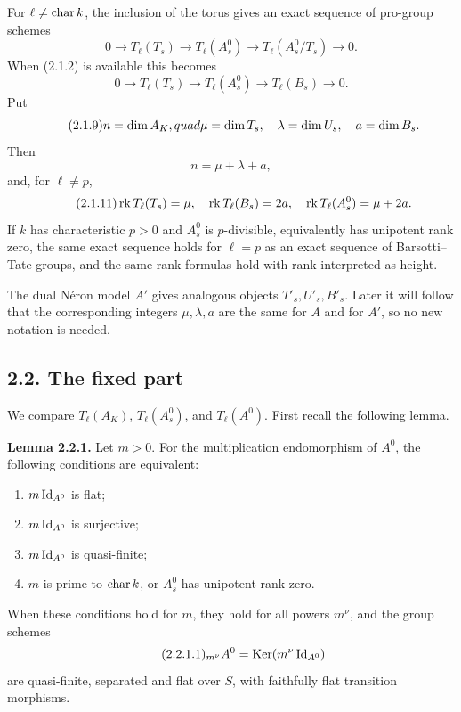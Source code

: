 \documentclass[11pt]{article}
\providecommand{\Ker}{\operatorname{Ker}}
\begin{document}
For \(\ell\ne\operatorname{char} k\), the inclusion of the torus gives an exact sequence of pro-group schemes
\begin{equation}\tag{2.1.6}
 0\longrightarrow T_\ell(T_s)\longrightarrow T_\ell(A_s^0)\longrightarrow T_\ell(A_s^0/T_s)\longrightarrow0.
\end{equation}
When (2.1.2) is available this becomes
\begin{equation}\tag{2.1.8}
 0\longrightarrow T_\ell(T_s)\longrightarrow T_\ell(A_s^0)\longrightarrow T_\ell(B_s)\longrightarrow0.
\end{equation}
Put
\begin{equation}\tag{2.1.9}
 n=\dim A_K,\\quad \mu=\dim T_s,
 \quad \lambda=\dim U_s,
 \quad a=\dim B_s.
\end{equation}
Then
\begin{equation}\tag{2.1.10}
 n=\mu+\lambda+a,
\end{equation}
and, for \(\ell\ne p\),
\begin{equation}\tag{2.1.11}
 \operatorname{rk} T_\ell(T_s)=\mu,
 \quad \operatorname{rk} T_\ell(B_s)=2a,
 \quad \operatorname{rk} T_\ell(A_s^0)=\mu+2a.
\end{equation}
If \(k\) has characteristic \(p>0\) and \(A_s^0\) is \(p\)-divisible, equivalently has unipotent rank zero, the same exact sequence holds for \(\ell=p\) as an exact sequence of Barsotti--Tate groups, and the same rank formulas hold with rank interpreted as height.

The dual N\'eron model \(A'\) gives analogous objects \(T'_s,U'_s,B'_s\).  Later it will follow that the corresponding integers \(\mu,\lambda,a\) are the same for \(A\) and for \(A'\), so no new notation is needed.

\subsection*{2.2. The fixed part}
We compare \(T_\ell(A_K)\), \(T_\ell(A_s^0)\), and \(T_\ell(A^0)\).  First recall the following lemma.

\textbf{Lemma 2.2.1.}  Let \(m>0\).  For the multiplication endomorphism of \(A^0\), the following conditions are equivalent:
\begin{enumerate}[label=(\roman*)]
\item \(m\operatorname{Id}_{A^0}\) is flat;
\item \(m\operatorname{Id}_{A^0}\) is surjective;
\item \(m\operatorname{Id}_{A^0}\) is quasi-finite;
\item \(m\) is prime to \(\operatorname{char} k\), or \(A_s^0\) has unipotent rank zero.
\end{enumerate}
When these conditions hold for \(m\), they hold for all powers \(m^\nu\), and the group schemes
\begin{equation}\tag{2.2.1.1}
 {}_{m^\nu}A^0=\Ker(m^\nu\Id_{A^0})
\end{equation}
are quasi-finite, separated and flat over \(S\), with faithfully flat transition morphisms.
\end{document}
